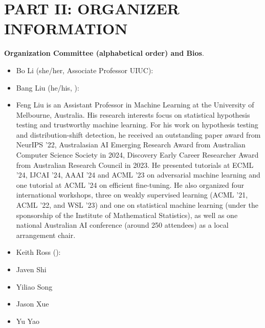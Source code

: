 \documentclass{article}
\begin{document}
\newpage
 
\newpage
 
\section*{\textcolor{neuripsblue}{\large PART II: ORGANIZER INFORMATION}}
\textbf{Organization Committee (alphabetical order) and Bios}. 
\begin{itemize}
    \item Bo Li (she/her, Associate Professor \@ UIUC): 
    \item Bang Liu (he/his, ): 
    \item Feng Liu is an Assistant Professor in Machine Learning at the University of Melbourne, Australia. His research interests focus on statistical hypothesis testing and trustworthy machine learning. For his work on hypothesis testing and distribution-shift detection, he received an outstanding paper award from NeurIPS '22,
Australasian AI Emerging Research Award from Australian Computer Science Society in 2024, Discovery Early Career Researcher Award from Australian Research Council in 2023. He presented tutorials at ECML '24, IJCAI ’24, AAAI ’24 and ACML ’23 on adversarial machine learning and one tutorial at ACML '24 on efficient fine-tuning. He also organized four international workshops, three on weakly supervised learning (ACML '21, ACML '22, and WSL '23) and one on statistical machine learning (under the sponsorship of the Institute of Mathematical Statistics), as well as one national Australian AI conference (around 250 attendees) as a local arrangement chair.
    \item Keith Ross (): 
    \item Javen Shi
    \item Yiliao Song
    \item Jason Xue
    \item Yu Yao

\end{itemize} 
\end{document}
